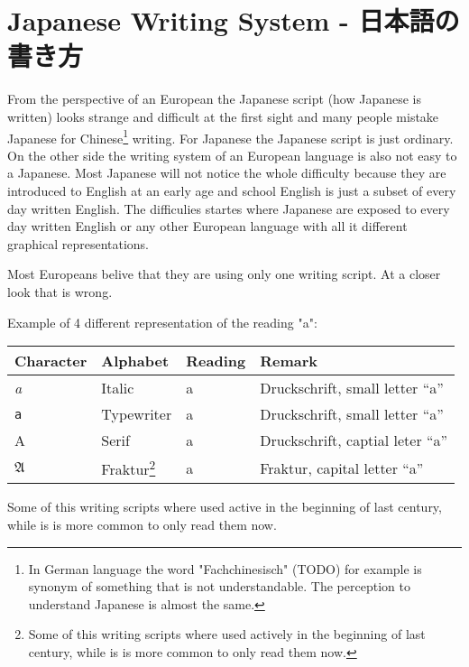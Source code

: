\chapter{Japanese Writing System - 日本語の書き方}\label{chap:JapaneseWritingSystem}

From the perspective of an European the Japanese script (how Japanese is
written) looks strange and difficult at the first sight and many people mistake
Japanese for Chinese\footnote{In German language the word "Fachchinesisch"
(TODO) for example is synonym of something that is not understandable. The
perception to understand Japanese is almost the same.} writing.  For Japanese
the Japanese script is just ordinary. On the other side the writing system of
an European language is also not easy to a Japanese. Most Japanese will not
notice the whole difficulty because they are introduced to English at an early
age and school English is just a subset of every day written English. The
difficulies startes where Japanese are exposed to every day written English or
any other European language with all it different graphical representations.

Most Europeans belive that they are using only one writing script. At a closer
look that is wrong.

\bigskip Example of 4 different representation of the reading "a":

\begin{center}
\begin{tabular}{|l|l|l|l|}
\textbf{Character}&\textbf{Alphabet}&\textbf{Reading}&\textbf{Remark}\\\hline
\textit{a}     &  Italic        & a & Druckschrift, small letter ``a'' \\ 
\texttt{a}     &  Typewriter    & a & Druckschrift, small letter ``a'' \\ 
A              &  Serif         & a & Druckschrift, captial leter ``a'' \\ 
$\mathfrak{A}$ & Fraktur\footnote{Some of this writing scripts where used actively in the beginning of last
century, while is is more common to only read them now.}& a & Fraktur, capital letter ``a''  \\ 
\end{tabular}
\end{center}

Some of this writing scripts where used active in the beginning of last
century, while is is more common to only read them now. 

